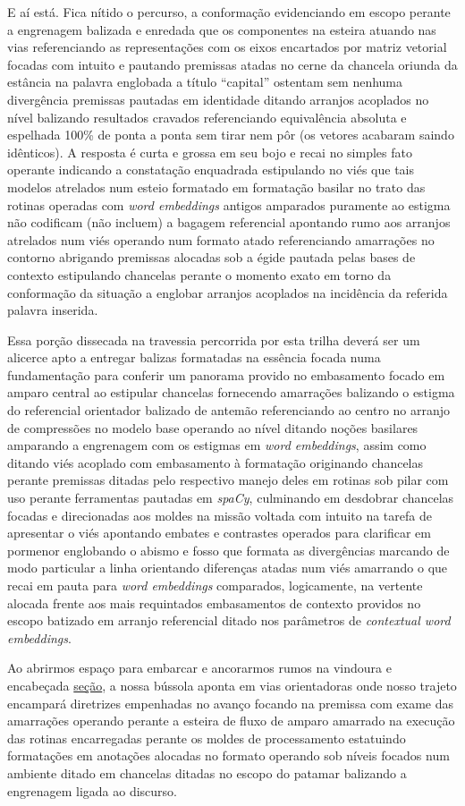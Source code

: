 \documentclass[
  brazilian,
]{article}
\begin{document}
E aí está. Fica nítido o percurso, a conformação evidenciando em escopo
perante a engrenagem balizada e enredada que os componentes na esteira
atuando nas vias referenciando as representações com os eixos encartados
por matriz vetorial focadas com intuito e pautando premissas atadas no
cerne da chancela oriunda da estância na palavra englobada a título
``capital'' ostentam sem nenhuma divergência premissas pautadas em
identidade ditando arranjos acoplados no nível balizando resultados
cravados referenciando equivalência absoluta e espelhada 100\% de ponta
a ponta sem tirar nem pôr (os vetores acabaram saindo idênticos). A
resposta é curta e grossa em seu bojo e recai no simples fato operante
indicando a constatação enquadrada estipulando no viés que tais modelos
atrelados num esteio formatado em formatação basilar no trato das
rotinas operadas com \emph{word embeddings} antigos amparados puramente
ao estigma não codificam (não incluem) a bagagem referencial apontando
rumo aos arranjos atrelados num viés operando num formato atado
referenciando amarrações no contorno abrigando premissas alocadas sob a
égide pautada pelas bases de contexto estipulando chancelas perante o
momento exato em torno da conformação da situação a englobar arranjos
acoplados na incidência da referida palavra inserida.

Essa porção dissecada na travessia percorrida por esta trilha deverá ser
um alicerce apto a entregar balizas formatadas na essência focada numa
fundamentação para conferir um panorama provido no embasamento focado em
amparo central ao estipular chancelas fornecendo amarrações balizando o
estigma do referencial orientador balizado de antemão referenciando ao
centro no arranjo de compressões no modelo base operando ao nível
ditando noções basilares amparando a engrenagem com os estigmas em
\emph{word embeddings}, assim como ditando viés acoplado com embasamento
à formatação originando chancelas perante premissas ditadas pelo
respectivo manejo deles em rotinas sob pilar com uso perante ferramentas
pautadas em \emph{spaCy}, culminando em desdobrar chancelas focadas e
direcionadas aos moldes na missão voltada com intuito na tarefa de
apresentar o viés apontando embates e contrastes operados para
clarificar em pormenor englobando o abismo e fosso que formata as
divergências marcando de modo particular a linha orientando diferenças
atadas num viés amarrando o que recai em pauta para \emph{word
embeddings} comparados, logicamente, na vertente alocada frente aos mais
requintados embasamentos de contexto providos no escopo batizado em
arranjo referencial ditado nos parâmetros de \emph{contextual word
embeddings}.

Ao abrirmos espaço para embarcar e ancorarmos rumos na vindoura e
encabeçada
\href{../unidade_6/trabalhando_com_anotacoes_de_nivel_de_discurso.html}{seção},
a nossa bússola aponta em vias orientadoras onde nosso trajeto encampará
diretrizes empenhadas no avanço focando na premissa com exame das
amarrações operando perante a esteira de fluxo de amparo amarrado na
execução das rotinas encarregadas perante os moldes de processamento
estatuindo formatações em anotações alocadas no formato operando sob
níveis focados num ambiente ditado em chancelas ditadas no escopo do
patamar balizando a engrenagem ligada ao discurso.
\end{document}
